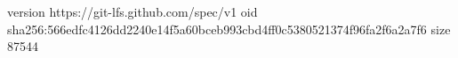 version https://git-lfs.github.com/spec/v1
oid sha256:566edfc4126dd2240e14f5a60bceb993cbd4ff0c5380521374f96fa2f6a2a7f6
size 87544
